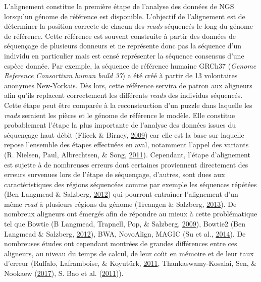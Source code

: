 \documentclass[12pt,twoside]{reedthesis}
\theoremstyle{definition}
\theoremstyle{definition}
\theoremstyle{remark}
\begin{document}
  L'alignement constitue la première étape de l'analyse des données de NGS
  lorsqu'un génome de référence est disponible. L'objectif de l'alignement
  est de déterminer la position correcte de chacun des \emph{reads}
  séquencés le long du génome de référence. Cette référence est souvent
  construite à partir des données de séquençage de plusieurs donneurs et
  ne représente donc pas la séquence d'un individu en particulier mais est
  censé représenter la séquence consensus d'une espèce donnée. Par
  exemple, la séquence de référence humaine GRCh37 (\emph{Genome Reference
  Consortium human build 37}) a été créé à partir de 13 volontaires
  anonymes New-Yorkais. Dès lors, cette référence servira de patron aux
  aligneurs afin qu'ils replacent correctement les différents \emph{reads}
  des individus séquencés. Cette étape peut être comparée à la
  reconstruction d'un puzzle dans laquelle les \emph{reads} seraient les
  pièces et le génome de référence le modèle. Elle constitue probablement
  l'étape la plus importante de l'analyse des données issues du séquençage
  haut débit (Flicek \& Birney, \protect\hyperlink{ref-Flicek2009}{2009})
  car elle est la base sur laquelle repose l'ensemble des étapes
  effectuées en aval, notamment l'appel des variants (R. Nielsen, Paul,
  Albrechtsen, \& Song, \protect\hyperlink{ref-Nielsen2011}{2011}).
  Cependant, l'étape d'alignement est sujette à de nombreuses erreurs dont
  certaines proviennent directement des erreurs survenues lors de l'étape
  de séquençage, d'autres, sont dues aux caractéristiques des régions
  séquencées comme par exemple les séquences répétées (Ben Langmead \&
  Salzberg, \protect\hyperlink{ref-Langmead2012}{2012}) qui pourront
  entraîner l'alignement d'un même \emph{read} à plusieurs régions du
  génome (Treangen \& Salzberg,
  \protect\hyperlink{ref-Treangen2013}{2013}). De nombreux aligneurs ont
  émergés afin de répondre au mieux à cette problématique tel que Bowtie
  (B Langmead, Trapnell, Pop, \& Salzberg,
  \protect\hyperlink{ref-Langmead2009}{2009}), Bowtie2 (Ben Langmead \&
  Salzberg, \protect\hyperlink{ref-Langmead2012}{2012}), BWA, NovoAlign,
  MAGIC (Su et al., \protect\hyperlink{ref-Su2014}{2014}). De nombreuses
  études ont cependant montrées de grandes différences entre ces
  aligneurs, au niveau du temps de calcul, de leur coût en mémoire et de
  leur taux d'erreur (Ruffalo, Laframboise, \& Koyutürk,
  \protect\hyperlink{ref-Ruffalo2011}{2011}, Thankaswamy-Kosalai, Sen, \&
  Nookaew (\protect\hyperlink{ref-Thankaswamy-Kosalai2017}{2017}), S. Bao
  et al. (\protect\hyperlink{ref-Bao2011}{2011})).
  
\end{document}
